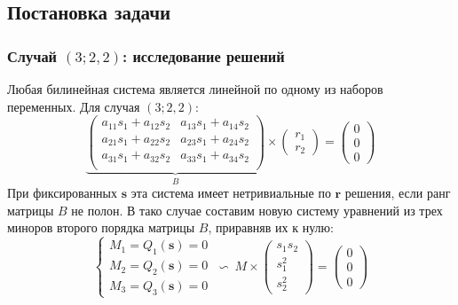 \documentclass[russian,hyperref={unicode}]{beamer}
\begin{document}
\subsection{Постановка задачи}
\frame
{
	\frametitle{Случай $(3; 2, 2)$: исследование решений}
	Любая билинейная система является линейной по одному из наборов переменных. Для 
	случая $(3;2, 2)$:
	$$
		\underbrace{
		\begin{pmatrix}
			a_{1 1} s_1 + a_{1 2} s_2 & a_{1 3} s_1 + a_{1 4} s_2 \\
			a_{2 1} s_1 + a_{2 2} s_2 & a_{2 3} s_1 + a_{2 4} s_2 \\
			a_{3 1} s_1 + a_{3 2} s_2 & a_{3 3} s_1 + a_{3 4} s_2 \\
		\end{pmatrix}}_{B}
		\times
		\begin{pmatrix}
			r_1 \\
			r_2
		\end{pmatrix}=
		\begin{pmatrix}
			0 \\
			0 \\
			0
		\end{pmatrix}
	$$
	При фиксированных $\mathbf{s}$ эта система имеет нетривиальные по $\mathbf{r}$ 
	решения, если ранг матрицы $B$ не полон.
	В тако случае составим новую систему уравнений из трех миноров второго порядка 
	матрицы $B$, приравняв их к нулю:
	$$
	\begin{cases} 
		M_1 = Q_1(\mathbf{s}) = 0 \\
		M_2 = Q_2(\mathbf{s}) = 0 \\
		M_3 = Q_3(\mathbf{s}) = 0
	\end{cases}
	~\backsim~	
	M \times 
	\begin{pmatrix}
	s_1 s_2 \\
	s_1 ^ 2 \\
	s_2 ^ 2
	\end{pmatrix}
	= 
	\begin{pmatrix}
	0 \\
	0 \\
	0
	\end{pmatrix}
	$$
}
\end{document}
